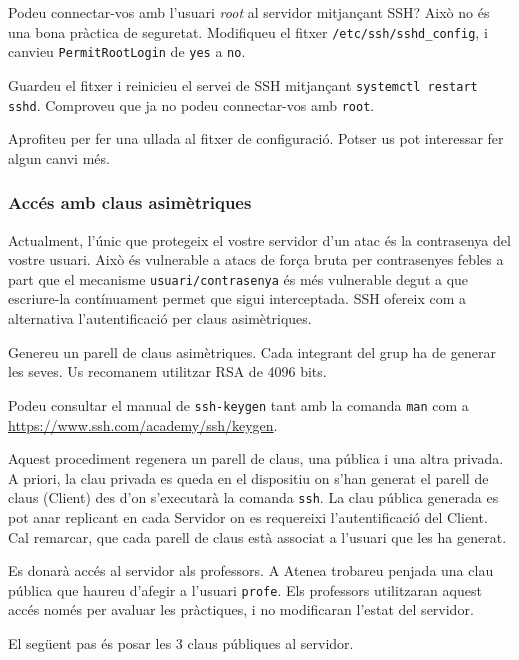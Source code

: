 \documentclass{practicaitic}
\begin{document}
\begin{previ}
Podeu connectar-vos amb l'usuari \textit{root} al servidor mitjançant SSH?
Això no és una bona pràctica de seguretat. Modifiqueu el fitxer \texttt{/etc/ssh/sshd\_config},
i canvieu \texttt{PermitRootLogin} de \verb|yes| a \verb|no|.

Guardeu el fitxer i
reinicieu el servei de SSH mitjançant \texttt{systemctl restart sshd}. Comproveu que
ja no podeu connectar-vos amb \texttt{root}.

Aprofiteu per fer una ullada al fitxer de configuració. Potser us pot interessar
fer algun canvi més.
\end{previ}

\subsubsection{Accés amb claus asimètriques}

Actualment, l'únic que protegeix el vostre servidor d'un atac és la
contrasenya del vostre usuari. Això és vulnerable a atacs de força
bruta per contrasenyes febles a part que el mecanisme
\texttt{usuari/contrasenya} és més vulnerable degut a que escriure-la
contínuament permet que sigui interceptada. SSH ofereix com a
alternativa l'autentificació per claus asimètriques.

\begin{previ}
Genereu un parell de claus asimètriques. Cada integrant del grup ha de
generar les seves. Us recomanem utilitzar RSA de 4096 bits.

Podeu consultar el manual de \texttt{ssh-keygen} tant amb la comanda
\texttt{man} com a \url{https://www.ssh.com/academy/ssh/keygen}.
\end{previ}

Aquest procediment regenera un parell de claus, una pública i una altra
privada. A priori, la clau privada es queda en el dispositiu on s'han
generat el parell de claus (Client) des d'on s'executarà la comanda
\texttt{ssh}. La clau pública generada es pot anar replicant en cada
Servidor on es requereixi l'autentificació del Client. Cal remarcar,
que cada parell de claus està associat a l'usuari que les ha generat.

Es donarà accés al servidor als professors. A Atenea trobareu penjada
una clau pública que haureu d'afegir a l'usuari \texttt{profe}. Els professors
utilitzaran aquest accés només per avaluar les pràctiques, i no modificaran
l'estat del servidor.

El següent pas
és posar les 3 claus públiques al servidor.
\end{document}
